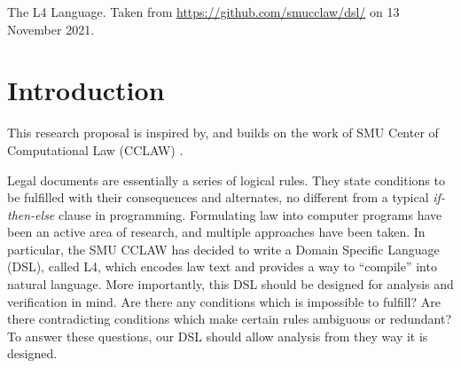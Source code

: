 \documentclass[11pt, sigconf]{acmart}
\begin{document}


\begin{teaserfigure}
  \caption{The L4 Language. Taken from \url{https://github.com/smucclaw/dsl/} on
    13 November 2021.}
  \label{fig:teaser}
\end{teaserfigure}
\maketitle
\section{Introduction}
\label{sec:intro}
This research proposal is inspired by, and builds on the work of SMU Center of
Computational Law (CCLAW) \cite{smucclaw, singapore_management_university_2021}.

Legal documents are essentially a series of logical rules. They state conditions
to be fulfilled with their consequences and alternates, no different from a
typical \emph{if-then-else} clause in programming. Formulating law into computer
programs have been an active area of research, and multiple approaches have been
taken. In particular, the SMU CCLAW has decided to write a Domain Specific
Language (DSL), called L4, which encodes law text and provides a way to
``compile'' into natural language. More importantly, this DSL should be designed
for analysis and verification in mind. Are there any conditions which is
impossible to fulfill? Are there contradicting conditions which make certain
rules ambiguous or redundant? To answer these questions, our DSL should allow
analysis from they way it is designed.
\end{document}
